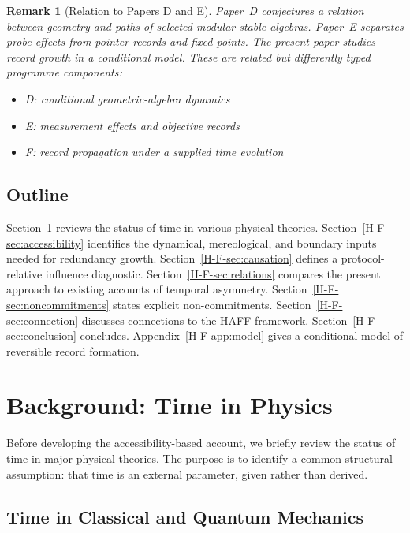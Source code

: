 \documentclass[12pt,a4paper,openany]{book}
\newtheorem{remark}[theorem]{Remark}
\begin{document}
\begin{remark}[Relation to Papers D and E]
Paper~D \cite{Liu2026PaperD} conjectures a relation between geometry and paths of selected modular-stable algebras. Paper~E \cite{Liu2026PaperE} separates probe effects from pointer records and fixed points. The present paper studies record growth in a conditional model. These are related but differently typed programme components:
\begin{itemize}
    \item D: conditional geometric-algebra dynamics
    \item E: measurement effects and objective records
    \item F: record propagation under a supplied time evolution
\end{itemize}
\end{remark}

\subsection{Outline}

Section~\ref{H-F-sec:background} reviews the status of time in various physical theories. Section~\ref{H-F-sec:accessibility} identifies the dynamical, mereological, and boundary inputs needed for redundancy growth. Section~\ref{H-F-sec:causation} defines a protocol-relative influence diagnostic. Section~\ref{H-F-sec:relations} compares the present approach to existing accounts of temporal asymmetry. Section~\ref{H-F-sec:noncommitments} states explicit non-commitments. Section~\ref{H-F-sec:connection} discusses connections to the HAFF framework. Section~\ref{H-F-sec:conclusion} concludes. Appendix~\ref{H-F-app:model} gives a conditional model of reversible record formation.

\section{Background: Time in Physics}
\label{H-F-sec:background}

Before developing the accessibility-based account, we briefly review the status of time in major physical theories. The purpose is to identify a common structural assumption: that time is an external parameter, given rather than derived.

\subsection{Time in Classical and Quantum Mechanics}
\end{document}
